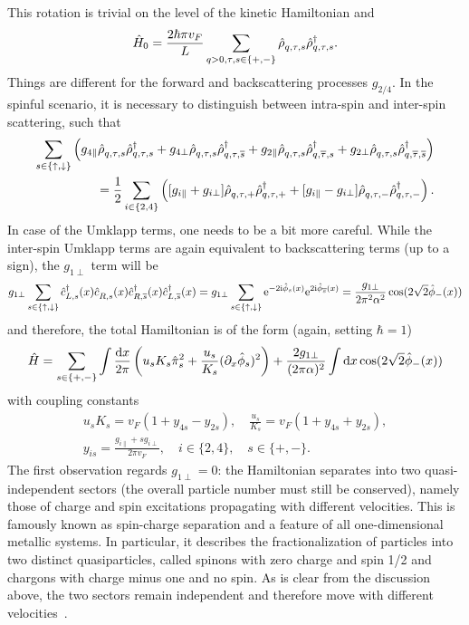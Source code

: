 This rotation is trivial on the level of the kinetic Hamiltonian and
\begin{align}
    \hat H_0 = \frac{2\hbar\pi v_F}L\sum_{q>0,\tau,s\in\{+,-\}}\hat\rho^\pdag_{q,\tau,s}\hat\rho^\dag_{q,\tau,s}.
\end{align}
Things are different for the forward and backscattering processes $g_{2/4}$.
In the spinful scenario, it is necessary to distinguish between intra-spin and inter-spin scattering, such that
\begin{align}
  \sum_{s\in\{\uparrow,\downarrow\}}
  \brlr{
  g_{4\parallel}\hat\rho^\pdag_{q,\tau,s}\hat\rho^\dag_{q,\tau,s}
  +
  g_{4\perp}\hat\rho^\pdag_{q,\tau,s}\hat\rho^\dag_{q,\tau,\overline s}
  +
  g_{2\parallel}\hat\rho^\pdag_{q,\tau,s}\hat\rho^\dag_{q,\overline\tau,s}
  +
  g_{2\perp}\hat\rho^\pdag_{q,\tau,s}\hat\rho^\dag_{q,\overline\tau,\overline s}
  }
  \\
  =
  \frac12
  \sum_{i\in\{2,4\}}
  \brlr{
  [g_{i\parallel}+g_{i\perp}]\hat\rho^\pdag_{q,\tau,+}\hat\rho^\dag_{q,\tau,+}
  +
  [g_{i\parallel}-g_{i\perp}]\hat\rho^\pdag_{q,\tau,-}\hat\rho^\dag_{q,\tau,-}
  }.
\end{align}
In case of the Umklapp terms, one needs to be a bit more careful.
While the inter-spin Umklapp terms are again equivalent to backscattering terms (up to a sign), the $g_{1\perp}$ term will be
\begin{align}
    g_{1\perp}\sum_{s\in\{\uparrow,\downarrow\}}\hat c^\dag_{L,s}(x)\hat c^\pdag_{R,s}(x)\hat c^\dag_{R,\overline s}(x)\hat c^\dag_{L,\overline s}(x)
    =
    g_{1\perp}\sum_{s\in\{\uparrow,\downarrow\}}\re^{-2\ri\hat \phi_s(x)}\re^{2\ri\hat \phi_{\overline s}(x)}
    =
    \frac{g_{1\perp}}{2\pi^2\alpha^2}\cos(2\sqrt2\hat \phi_-(x))
\end{align}
and therefore, the total Hamiltonian is of the form (again, setting $\hbar=1$)
\begin{align}
    \hat H = \sum_{s\in\{+,-\}}\int\frac{\mathrm d x}{2\pi}\left( u_s K_s\hat\pi_s^2 + \frac{u_s}{K_s}(\partial_x\hat\phi_s)^2 \right)
    +
    \frac{2g_{1\perp}}{(2\pi\alpha)^2}\int\mathrm d x\cos(2\sqrt2\hat\phi_-(x))
    \label{eq:ll_hamiltonian_spin}
\end{align}
with coupling constants
\begin{align}
    u_sK_s = v_F(1+y_{4s}-y_{2s}),
    \quad
    \frac{u_s}{K_s} = v_F(1+y_{4s}+y_{2s}),
    \\
    y_{is} = \frac{g_{i\parallel}+sg_{i\perp}}{2\pi v_F},
    \quad
    i\in\{2,4\},
    \quad
    s\in\{+,-\}.
\end{align}
The first observation regards $g_{1\perp}=0$: the Hamiltonian separates into two quasi-independent sectors (the overall particle number must still be conserved), namely those of charge and spin excitations propagating with different velocities.
This is famously known as spin-charge separation and a feature of all one-dimensional metallic systems.
In particular, it describes the fractionalization of particles into two distinct quasiparticles, called spinons with zero charge and spin 1/2 and chargons with charge minus one and no spin.
As is clear from the discussion above, the two sectors remain independent and therefore move with different velocities~\cite{Tomonaga1950,Luttinger1963,Haldane1981,Kim2006}.

